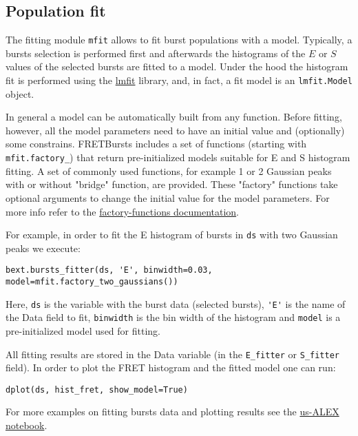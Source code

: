 
\subsection{Population fit}

The fitting module \verb|mfit| allows to fit burst populations with a model.
Typically, a bursts selection is performed first and afterwards the histograms of
the $E$ or $S$ values of the selected bursts are fitted to a model. Under the
hood the histogram fit is performed using the
\href{http://lmfit.github.io/lmfit-py/}{lmfit} library, and, in fact, 
a fit model is an \verb|lmfit.Model| object.

In general a model can be automatically built from any function. Before fitting,
however, all the model parameters need to have an initial value and (optionally)
some constrains. FRETBursts includes a set of functions (starting with
\verb|mfit.factory_|) that return pre-initialized models suitable for E and S
histogram fitting. A set of commonly used functions, for example 1 or 2 Gaussian
peaks with or without "bridge" function, are provided. These "factory" functions
take optional arguments to change the initial value for the model parameters.
For more info refer to the
\href{http://fretbursts.readthedocs.org/en/latest/mfit.html#model-factory-functions}{factory-functions documentation}.

For example, in order to fit the E histogram of bursts in \verb|ds| with two
Gaussian peaks we execute:

\begin{verbatim}
bext.bursts_fitter(ds, 'E', binwidth=0.03, model=mfit.factory_two_gaussians())
\end{verbatim}

Here, \verb|ds| is the variable with the burst data (selected bursts),
\verb|'E'| is the name of the Data field to fit, \verb|binwidth| is the bin
width of the histogram and \verb|model| is a pre-initialized model used for
fitting.

All fitting results are stored in the Data variable (in the \verb|E_fitter| or
\verb|S_fitter| field).
In order to plot the FRET histogram and the fitted model one can run:

\begin{verbatim}
dplot(ds, hist_fret, show_model=True)
\end{verbatim}

For more examples on fitting bursts data and plotting results see the
\href{http://nbviewer.ipython.org/urls/raw.github.com/tritemio/FRETBursts_notebooks/master/notebooks/FRETBursts\%2520-\%2520us-ALEX\%2520smFRET\%2520burst\%2520analysis.ipynb}{us-ALEX notebook}.


